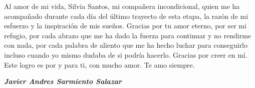 Al amor de mi vida, Silvia Santos, mi compañera incondicional, quien me ha acompañado durante cada día del último trayecto de esta etapa, la razón de mi esfuerzo y la inspiración de mis sueños. Gracias por tu amor eterno, por ser mi refugio, por cada abrazo que me ha dado la fuerza para continuar y no rendirme con nada, por cada palabra de aliento que me ha hecho luchar para conseguirlo incluso cuando yo mismo dudaba de si podría hacerlo. Gracias por creer en mí. Este logro es por y para ti, con mucho amor. Te amo siempre.

\begin{flushright}
    \textbf{\textit{Javier Andres Sarmiento Salazar}}
\end{flushright}

\newpage
